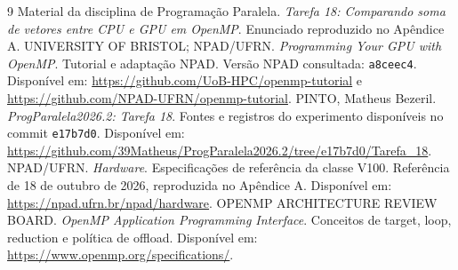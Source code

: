 \documentclass[12pt,a4paper]{article}
\begin{document}
\clearpage
\begin{thebibliography}{9}
 Material da disciplina de Programação Paralela. \textit{Tarefa 18: Comparando soma de vetores entre CPU e GPU em OpenMP}. Enunciado reproduzido no Apêndice A.
 UNIVERSITY OF BRISTOL; NPAD/UFRN. \textit{Programming Your GPU with OpenMP}. Tutorial e adaptação NPAD. Versão NPAD consultada: \texttt{a8ceec4}. Disponível em: \url{https://github.com/UoB-HPC/openmp-tutorial} e \url{https://github.com/NPAD-UFRN/openmp-tutorial}.
 PINTO, Matheus Bezeril. \textit{ProgParalela2026.2: Tarefa 18}. Fontes e registros do experimento disponíveis no commit \texttt{e17b7d0}. Disponível em: \url{https://github.com/39Matheus/ProgParalela2026.2/tree/e17b7d0/Tarefa_18}.
 NPAD/UFRN. \textit{Hardware}. Especificações de referência da classe V100. Referência de 18 de outubro de 2026, reproduzida no Apêndice A. Disponível em: \url{https://npad.ufrn.br/npad/hardware}.
 OPENMP ARCHITECTURE REVIEW BOARD. \textit{OpenMP Application Programming Interface}. Conceitos de target, loop, reduction e política de offload. Disponível em: \url{https://www.openmp.org/specifications/}.
\end{thebibliography}
\end{document}
